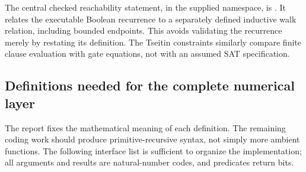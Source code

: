 The central checked reachability statement, in the supplied namespace, is
. It relates the executable Boolean recurrence
to a separately defined inductive walk relation, including bounded
endpoints. This avoids validating the recurrence merely by restating its
definition. The Tseitin constraints similarly compare finite clause
evaluation with gate equations, not with an assumed SAT specification.

\subsection{Definitions needed for the complete numerical layer}

The report fixes the mathematical meaning of each definition. The remaining
coding work should produce primitive-recursive syntax, not simply more
ambient functions. The following interface list is sufficient to organize
the implementation; all arguments and results are natural-number codes,
and predicates return bits.

